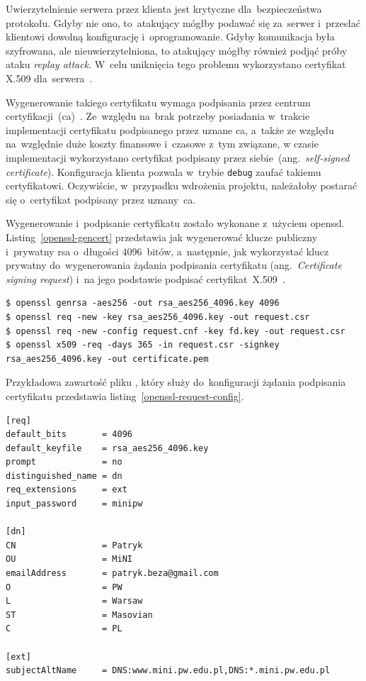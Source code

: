 \documentclass[thesis]{subfiles}
\begin{document}
Uwierzytelnienie serwera przez klienta jest krytyczne dla~bezpieczeństwa protokołu. Gdyby nie ono, to~atakujący mógłby podawać się za~serwer i~przesłać klientowi dowolną konfigurację i~oprogramowanie. Gdyby komunikacja była szyfrowana, ale nieuwierzytelniona, to atakujący mógłby również podjąć próby ataku \emph{replay attack}. W~celu uniknięcia tego problemu wykorzystano certyfikat X.509 dla~serwera~\cite{wiki:x509}.

Wygenerowanie takiego certyfikatu wymaga podpisania przez centrum certyfikacji~(\gls{ca})~\cite{wiki:ca}. Ze~względu na~brak potrzeby posiadania w~trakcie implementacji certyfikatu podpisanego przez uznane \gls{ca}, a~także ze względu na~względnie duże koszty finansowe i~czasowe z~tym związane, w czasie implementacji wykorzystano certyfikat podpisany przez siebie~(ang.~\emph{self-signed certificate}). Konfiguracja klienta pozwala w~trybie \texttt{debug} zaufać takiemu certyfikatowi. Oczywiście, w~przypadku wdrożenia projektu, należałoby postarać się o~certyfikat podpisany przez uznany~\gls{ca}.

Wygenerowanie i~podpisanie certyfikatu zostało wykonane z~użyciem \gls{openssl}. Listing~\ref{openssl-gencert} przedstawia jak wygenerować klucze publiczny i~prywatny \gls{rsa} o~długości 4096~bitów, a~następnie, jak wykorzystać klucz prywatny do~wygenerowania żądania podpisania certyfikatu (ang.~\emph{Certificate signing request}) i~na jego podstawie podpisać certyfikat~X.509~\cite{openssl-cookbook,wiki:csr}.

\begin{lstlisting}[numbers=none,caption={Wygenerowanie i~podpisanie certyfikatu X.509},label=openssl-gencert]
$ openssl genrsa -aes256 -out rsa_aes256_4096.key 4096
$ openssl req -new -key rsa_aes256_4096.key -out request.csr
$ openssl req -new -config request.cnf -key fd.key -out request.csr
$ openssl x509 -req -days 365 -in request.csr -signkey rsa_aes256_4096.key -out certificate.pem
\end{lstlisting}

Przykładowa zawartość pliku , który służy do~konfiguracji żądania podpisania certyfikatu przedstawia listing~\ref{openssl-request-config}.

\begin{lstlisting}[numbers=none,caption={Plik z~konfiguracją certyfikatu X.509},label=openssl-request-config]
[req]
default_bits       = 4096
default_keyfile    = rsa_aes256_4096.key
prompt             = no
distinguished_name = dn
req_extensions     = ext
input_password     = minipw

[dn]
CN                 = Patryk
OU                 = MiNI
emailAddress       = patryk.beza@gmail.com
O                  = PW
L                  = Warsaw
ST                 = Masovian
C                  = PL

[ext]
subjectAltName     = DNS:www.mini.pw.edu.pl,DNS:*.mini.pw.edu.pl
\end{lstlisting}
\end{document}
